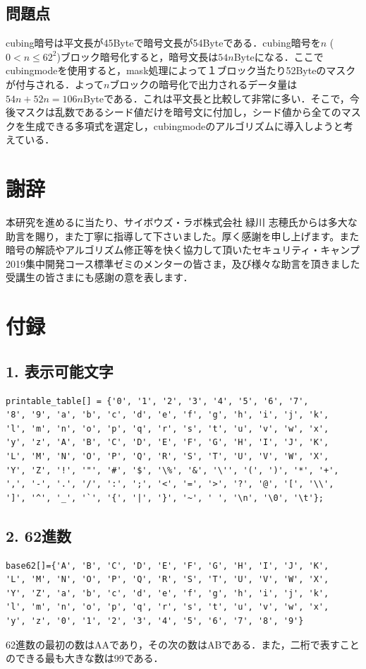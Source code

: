 \documentclass[titlepage]{jarticle}
\begin{document}
\subsection{問題点}
cubing暗号は平文長が45Byteで暗号文長が54Byteである．cubing暗号を\(n\) (\(0 < n \leq 62^2\))ブロック暗号化すると，暗号文長は\(54n\)Byteになる．ここでcubingmodeを使用すると，mask処理によって１ブロック当たり52Byteのマスクが付与される．よって\(n\)ブロックの暗号化で出力されるデータ量は\(54n+52n=106n\)Byteである．これは平文長と比較して非常に多い．そこで，今後マスクは乱数であるシード値だけを暗号文に付加し，シード値から全てのマスクを生成できる多項式を選定し，cubingmodeのアルゴリズムに導入しようと考えている．

\section{謝辞}
本研究を進めるに当たり、サイボウズ・ラボ株式会社 緑川 志穂氏からは多大な助言を賜り，また丁寧に指導して下さいました。厚く感謝を申し上げます。また暗号の解読やアルゴリズム修正等を快く協力して頂いたセキュリティ・キャンプ2019集中開発コース標準ゼミのメンターの皆さま，及び様々な助言を頂きました受講生の皆さまにも感謝の意を表します．

\section{付録}
\subsection{1. 表示可能文字}
\begin{verbatim}
printable_table[] = {'0', '1', '2', '3', '4', '5', '6', '7', 
'8', '9', 'a', 'b', 'c', 'd', 'e', 'f', 'g', 'h', 'i', 'j', 'k', 
'l', 'm', 'n', 'o', 'p', 'q', 'r', 's', 't', 'u', 'v', 'w', 'x', 
'y', 'z', 'A', 'B', 'C', 'D', 'E', 'F', 'G', 'H', 'I', 'J', 'K', 
'L', 'M', 'N', 'O', 'P', 'Q', 'R', 'S', 'T', 'U', 'V', 'W', 'X', 
'Y', 'Z', '!', '"', '#', '$', '\%', '&', '\'', '(', ')', '*', '+', 
',', '-', '.', '/', ':', ';', '<', '=', '>', '?', '@', '[', '\\', 
']', '^', '_', '`', '{', '|', '}', '~', ' ', '\n', '\0', '\t'};
\end{verbatim}

\subsection{2. 62進数}
\begin{verbatim}
base62[]={'A', 'B', 'C', 'D', 'E', 'F', 'G', 'H', 'I', 'J', 'K', 
'L', 'M', 'N', 'O', 'P', 'Q', 'R', 'S', 'T', 'U', 'V', 'W', 'X', 
'Y', 'Z', 'a', 'b', 'c', 'd', 'e', 'f', 'g', 'h', 'i', 'j', 'k', 
'l', 'm', 'n', 'o', 'p', 'q', 'r', 's', 't', 'u', 'v', 'w', 'x', 
'y', 'z', '0', '1', '2', '3', '4', '5', '6', '7', '8', '9'}
\end{verbatim}
62進数の最初の数はAAであり，その次の数はABである．また，二桁で表すことのできる最も大きな数は99である．
\end{document}
